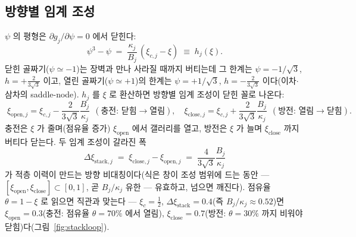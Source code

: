 \documentclass[11pt,a4paper]{article}
\begin{document}
\subsection{방향별 임계 조성}
$\psi$ 의 평형은 $\partial g_j/\partial\psi=0$ 에서 닫힌다:
\begin{equation}
\psi^3-\psi\;=\;\frac{\kappa_j}{B_j}\,(\xi_{c,j}-\xi)\;\equiv\;h_j(\xi).
\label{eq:psieq}
\end{equation}
닫힌 골짜기($\psi\simeq-1$)는 장벽과 만나 사라질 때까지 버티는데 그 한계는 $\psi=-1/\sqrt3$,
$h=+\tfrac{2}{3\sqrt3}$ 이고, 열린 골짜기($\psi\simeq+1$)의 한계는 $\psi=+1/\sqrt3$,
$h=-\tfrac{2}{3\sqrt3}$ 이다(이차$\cdot$삼차의 saddle-node). $h_j$ 를 $\xi$ 로 환산하면 방향별 임계
조성이 닫힌 꼴로 나온다:
\begin{equation}
\boxed{\;
\xi_{\mathrm{open},j}=\xi_{c,j}-\frac{2}{3\sqrt3}\frac{B_j}{\kappa_j}
\ \ (\text{충전: 닫힘}\to\text{열림}),\quad
\xi_{\mathrm{close},j}=\xi_{c,j}+\frac{2}{3\sqrt3}\frac{B_j}{\kappa_j}
\ \ (\text{방전: 열림}\to\text{닫힘}).\;}
\label{eq:xistack}
\end{equation}
충전은 $\xi$ 가 줄며(점유율 증가) $\xi_{\mathrm{open}}$ 에서 갤러리를 열고, 방전은 $\xi$ 가 늘며
$\xi_{\mathrm{close}}$ 까지 버티다 닫는다. 두 임계 조성이 갈라진 폭
\begin{equation}
\Delta\xi_{\mathrm{stack},j}\;=\;\xi_{\mathrm{close},j}-\xi_{\mathrm{open},j}
\;=\;\frac{4}{3\sqrt3}\frac{B_j}{\kappa_j}
\label{eq:dxistack}
\end{equation}
가 적층 이력이 만드는 방향 비대칭이다(식은 창이 조성 범위에 드는 동안 — $[\xi_{\mathrm{open}},\xi_{\mathrm{close}}]\subset[0,1]$, 곧 $B_j/\kappa_j$ 유한 — 유효하고, 넘으면 깨진다). 점유율 $\theta=1-\xi$ 로 읽으면 직관과 맞는다 — $\xi_{c}=\tfrac12$,
$\Delta\xi_{\mathrm{stack}}=0.4$(즉 $B_j/\kappa_j\approx0.52$)면 $\xi_{\mathrm{open}}=0.3$(충전: 점유율 $\theta=70\%$ 에서 열림),
$\xi_{\mathrm{close}}=0.7$(방전: $\theta=30\%$ 까지 비워야 닫힘)다(그림~\ref{fig:stackloop}).
\end{document}
